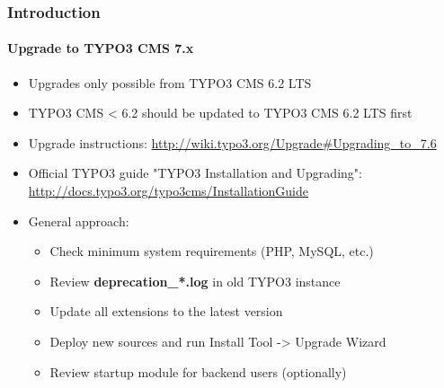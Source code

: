 \begin{frame}[fragile]
	\frametitle{Introduction}
	\framesubtitle{Upgrade to TYPO3 CMS 7.x}

	\begin{itemize}
		\item Upgrades only possible from TYPO3 CMS 6.2 LTS
		\item TYPO3 CMS < 6.2 should be updated to TYPO3 CMS 6.2 LTS first
	\end{itemize}

	\begin{itemize}

		\item Upgrade instructions:\newline
			\smaller\url{http://wiki.typo3.org/Upgrade#Upgrading_to_7.6}\normalsize
		\item Official TYPO3 guide "TYPO3 Installation and Upgrading":
			\smaller\url{http://docs.typo3.org/typo3cms/InstallationGuide}\normalsize
		\item General approach:
			\begin{itemize}
				\item Check minimum system requirements \small(PHP, MySQL, etc.)
				\item Review \textbf{deprecation\_*.log} in old TYPO3 instance
				\item Update all extensions to the latest version
				\item Deploy new sources and run Install Tool -> Upgrade Wizard
				\item Review startup module for backend users (optionally)
			\end{itemize}
	\end{itemize}

\end{frame}

